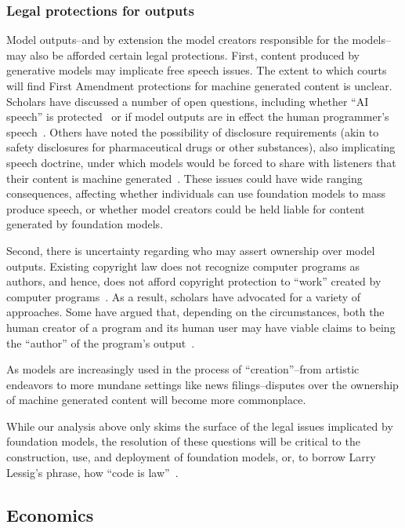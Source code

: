 \subsubsection{Legal protections for outputs} Model outputs--and by extension the model creators responsible for the models--may also be afforded certain legal protections. First, content produced by generative models may implicate free speech issues. The extent to which courts will find First Amendment protections for machine generated content is unclear. Scholars have discussed a number of open questions, including whether ``AI speech'' is protected~\citep{massaro2016siri} or if model outputs are in effect the human programmer’s speech~\citep{kajbaf2019first}. Others have noted the possibility of disclosure requirements (akin to safety disclosures for pharmaceutical drugs or other substances), also implicating speech doctrine, under which models would be forced to share with listeners that their content is machine generated~\citep{lamo2019regulating}. These issues could have wide ranging consequences, affecting whether individuals can use foundation models to mass produce speech, or whether model creators could be held liable for content generated by foundation models.

Second, there is uncertainty regarding who may assert ownership over model outputs.  Existing copyright law does not recognize computer programs as authors, and hence, does not afford copyright protection to ``work'' created by computer programs~\citep{grimmelmann2015there}. As a result, scholars have advocated for a variety of approaches. Some have argued that, depending on the circumstances, both the human creator of a program and its human user may have viable claims to being the ``author'' of the program’s output~\citep{ginsburg2019authors}. 

As models are increasingly used in the process of ``creation''--from artistic endeavors to more mundane settings like news filings--disputes over the ownership of machine generated content will become more commonplace.

While our analysis above only skims the surface of the legal issues implicated by foundation models, the resolution of these questions will be critical to the construction, use, and deployment of foundation models, or, to borrow Larry Lessig’s phrase, how “code is law”~\citep{code_is_law}.

\newsection
\subsection{Economics}
\label{sec:economics}

